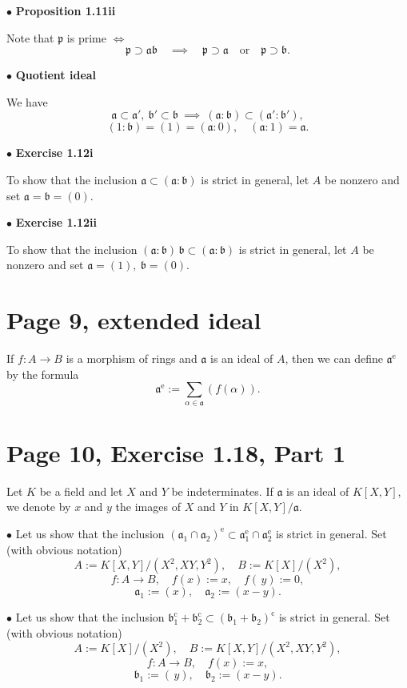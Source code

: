 \documentclass[12pt]{article}
\newcommand{\oo}{\operatorname}
\newcommand{\mf}{\mathfrak}
\newcommand{\bu}{\bullet}
\begin{document}

$\bu$ \textbf{\Large Proposition 1.11ii}%

Note that $\mf p$ is prime $\iff$
$$
\mf p\supset\mf a\mf b\quad\implies\quad\mf p\supset\mf a\quad\text{or}\quad\mf p\supset\mf b.
$$

$\bu$ \textbf{\Large Quotient ideal}%

We have 
$$
\mf a\subset\mf a',\ \mf b'\subset\mf b\ \implies\ (\mf a:\mf b)\subset(\mf a':\mf b'),
$$ 
$$
(1:\mf b)=(1)=(\mf a:0),\quad(\mf a:1)=\mf a.
$$

$\bu$ \textbf{\Large Exercise 1.12i}%

To show that the inclusion $\mf a\subset(\mf a:\mf b)$ is strict in general, let $A$ be nonzero and set $\mf a=\mf b=(0)$.

$\bu$ \textbf{\Large Exercise 1.12ii}%

To show that the inclusion $(\mf a\!:\!\mf b)\,\mf b\subset(\mf a:\mf b)$ is strict in general, let $A$ be nonzero and set $\mf a=(1),\ \mf b=(0)$.

\section{Page 9, extended ideal}%

If $f:A\to B$ is a morphism of rings and $\mf a$ is an ideal of $A$, then we can define $\mf a^{\oo e}$ by the formula
$$
\mf a^{\oo e}:=\sum_{\alpha\in\mf a}(f(\alpha)).
$$

\section{Page 10, Exercise 1.18, Part 1}%

Let $K$ be a field and let $X$ and $Y$ be indeterminates. If $\mf a$ is an ideal of $K[X,Y]$, we denote by $x$ and $y$ the images of $X$ and $Y$ in $K[X,Y]/\mf a$.

$\bu$ Let us show that the inclusion $(\mf a_1\cap\mf a_2)^{\oo e}\subset\mf a_1^{\oo e}\cap\mf a_2^{\oo e}$ is strict in general. Set (with obvious notation) 
$$
A:=K[X,Y]/(X^2,XY,Y^2),\quad B:=K[X]/(X^2),
$$ 
$$
f:A\to B,\quad f(x):=x,\quad f(\,y):=0,
$$ 
$$
\mf a_1:=(x),\quad\mf a_2:=(x-y).
$$

$\bu$ Let us show that the inclusion $\mf b_1^{\oo c}+\mf b_2^{\oo c}\subset(\mf b_1+\mf b_2)^{\oo c}$ is strict in general. Set (with obvious notation) 
$$
A:=K[X]/(X^2),\quad B:=K[X,Y]/(X^2,XY,Y^2),
$$ 
$$
f:A\to B,\quad f(x):=x,
$$ 
$$
\mf b_1:=(\,y),\quad\mf b_2:=(x-y).
$$
\end{document}
